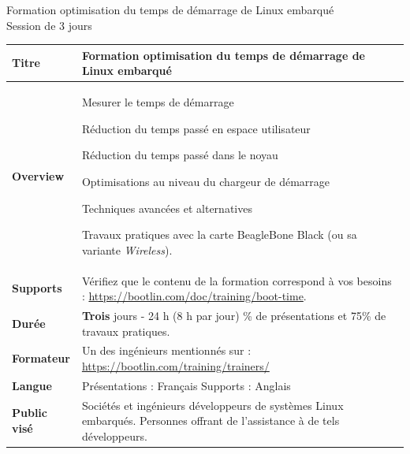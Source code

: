 \documentclass[a4paper,12pt,obeyspaces,spaces,hyphens]{article}
\begin{document}
\setlength{\arrayrulewidth}{0.8pt}

\begin{center}
\LARGE
Formation optimisation du temps de démarrage de Linux embarqué\\
\large
Session de 3 jours
\end{center}
\vspace{1cm}

\small
{}

 {
  \begin{tabularx}{\textwidth}{|g|h|}
    {\bf Titre} & {\bf Formation optimisation du temps de démarrage de Linux embarqué} \\
    \hline

    {\bf Overview} &
    Mesurer le temps de démarrage \par
    Réduction du temps passé en espace utilisateur \par
    Réduction du temps passé dans le noyau \par
    Optimisations au niveau du chargeur de démarrage \par
    Techniques avancées et alternatives \par
    Travaux pratiques avec la carte BeagleBone Black
    (ou sa variante {\em Wireless}).\\
    \hline
    {\bf Supports} &
    Vérifiez que le contenu de la formation correspond à vos besoins :
    \newline \url{https://bootlin.com/doc/training/boot-time}. \\
    \hline

    {\bf Durée} & {\bf Trois} jours - 24 h (8 h par jour)
    \% de présentations et 75\% de travaux pratiques. \\
    \hline

    {\bf Formateur} & Un des ingénieurs mentionnés sur :
    \newline \url{https://bootlin.com/training/trainers/}\\
    \hline

    {\bf Langue} & Présentations : Français
    \newline Supports : Anglais\\
    \hline

    {\bf Public visé} & Sociétés et ingénieurs développeurs de systèmes Linux embarqués.
    \newline Personnes offrant de l'assistance à de tels développeurs.\\
    \hline


\end{tabularx}}
\end{document}
